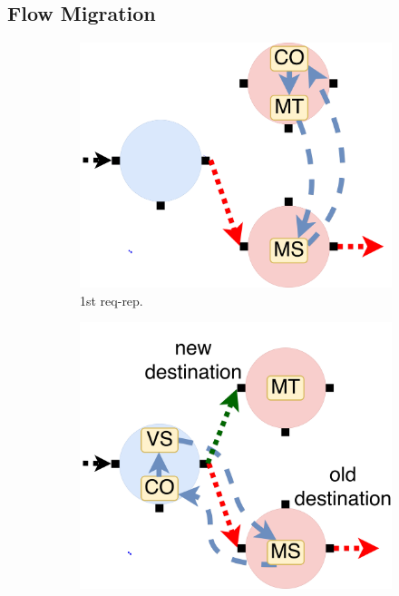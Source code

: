 \subsection{Flow Migration}

\begin{figure}[!t]
\begin{subfigure}[t]{0.33\linewidth}
   \centering
   \includegraphics[width=\columnwidth]{figure/nfactor-mig1.pdf}
   \caption{1st req-rep.}\label{fig:mig1}
  \end{subfigure}\hfill
  \begin{subfigure}[t]{0.33\linewidth}
     \centering
     \includegraphics[width=\columnwidth]{figure/nfactor-mig2.pdf}

\end{subfigure}
\end{figure}
